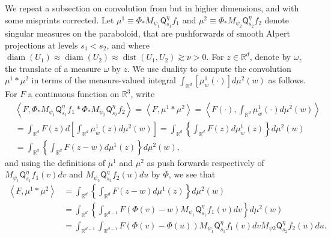 \documentclass{amsart}%
\theoremstyle{plain}
\numberwithin{equation}{section}
\begin{document}
We repeat a subsection on convolution from \cite{RiSa} but in higher
dimensions, and with some misprints corrected. Let $\mu^{1}\equiv\Phi_{\ast
}M_{\psi_{1}}\mathsf{Q}_{s_{1}}^{\eta}f_{1}$ and $\mu^{2}\equiv\Phi_{\ast
}M_{\psi_{2}}\mathsf{Q}_{s_{2}}^{\eta}f_{2}$ denote singular measures on the
paraboloid, that are pushforwards of smooth Alpert projections at levels
$s_{1}<s_{2}$, and where $\operatorname*{diam}\left(  U_{1}\right)
\approx\operatorname*{diam}\left(  U_{2}\right)  \approx\operatorname*{dist}%
\left(  U_{1},U_{2}\right)  \gtrsim\nu>0$. For $z\in\mathbb{R}^{d}$, denote by
$\omega_{z}$ the translate of a measure $\omega$ by $z$. We use duality to
compute the convolution $\mu^{1}\ast\mu^{2}$ in terms of the measure-valued
integral $\int_{\mathbb{R}^{d}}\left[  \mu_{w}^{1}\left(  \cdot\right)
\right]  d\mu^{2}\left(  w\right)  $ as follows. For $F$ a continuous function
on $\mathbb{R}^{3}$, write
\begin{align*}
& \left\langle F,\Phi_{\ast}M_{\psi_{1}}\mathsf{Q}_{s_{1}}^{\eta}f_{1}\ast
\Phi_{\ast}M_{\psi_{2}}\mathsf{Q}_{s_{2}}^{\eta}f_{2}\right\rangle
=\left\langle F,\mu^{1}\ast\mu^{2}\right\rangle =\left\langle F\left(
\cdot\right)  ,\int_{\mathbb{R}^{d}}\mu_{w}^{1}\left(  \cdot\right)  d\mu
^{2}\left(  w\right)  \right\rangle \\
& =\int_{\mathbb{R}^{d}}F\left(  z\right)  d\left[  \int_{\mathbb{R}^{d}}%
\mu_{w}^{1}\left(  z\right)  d\mu^{2}\left(  w\right)  \right]  =\int
_{\mathbb{R}^{d}}\left\{  \int_{\mathbb{R}^{d}}F\left(  z\right)  d\mu_{w}%
^{1}\left(  z\right)  \right\}  d\mu^{2}\left(  w\right) \\
& =\int_{\mathbb{R}^{d}}\left\{  \int_{\mathbb{R}^{d}}F\left(  z-w\right)
d\mu^{1}\left(  z\right)  \right\}  d\mu^{2}\left(  w\right)  ,
\end{align*}
and using the definitions of $\mu^{1}$ and $\mu^{2}$ as push forwards
respectively of $M_{\psi_{1}}\mathsf{Q}_{s_{1}}^{\eta}f_{1}\left(  v\right)
dv$ and $M_{\psi_{2}}\mathsf{Q}_{s_{2}}^{\eta}f_{2}\left(  u\right)  du$ by
$\Phi$, we see that%
\begin{align*}
\left\langle F,\mu^{1}\ast\mu^{2}\right\rangle  & =\int_{\mathbb{R}^{d}%
}\left\{  \int_{\mathbb{R}^{d}}F\left(  z-w\right)  d\mu^{1}\left(  z\right)
\right\}  d\mu^{2}\left(  w\right) \\
& =\int_{\mathbb{R}^{d}}\left\{  \int_{\mathbb{R}^{d-1}}F\left(  \Phi\left(
v\right)  -w\right)  M_{\psi_{1}}\mathsf{Q}_{s_{1}}^{\eta}f_{1}\left(
v\right)  dv\right\}  d\mu^{2}\left(  w\right) \\
& =\int_{\mathbb{R}^{d-1}}\int_{\mathbb{R}^{d-1}}F\left(  \Phi\left(
v\right)  -\Phi\left(  u\right)  \right)  M_{\psi_{1}}\mathsf{Q}_{s_{1}}%
^{\eta}f_{1}\left(  v\right)  dvM_{\psi2}\mathsf{Q}_{s_{2}}^{\eta}f_{2}\left(
u\right)  du.
\end{align*}
\end{document}
